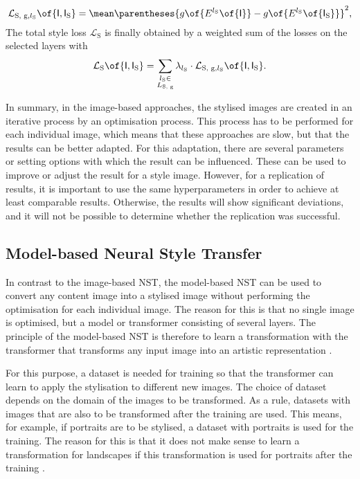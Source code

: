 \begin{equation*}
	\mathcal{L}_{\text{S, g}\eqcommasep l_\text{S}}\of{\tensor{I}\eqcommasep \tensor{I}_\text{S}} = \mean \parentheses{g\of{E^{l_\text{S}}\of{\tensor{I}}} - g\of{E^{l_\text{S}}\of{\tensor{I}_\text{S}}}}^2\eqtextcomma
\end{equation*}
The total style loss $\mathcal{L}_\text{S}$ is finally obtained by a weighted sum of the losses on the selected layers with \cite{GEB2016}
\begin{equation*}
	\mathcal{L}_\text{S}\of{\tensor{I}\eqcommasep \tensor{I}_\text{S}} = \sum_{\substack{l_\text{S} \in\\L_\text{S, g}}} \lambda_{l_\text{S}} \cdot \mathcal{L}_{\text{S, g}\eqcommasep l_\text{S}}\of{\tensor{I}\eqcommasep \tensor{I}_\text{S}} \eqtextdot
\end{equation*}

In summary, in the image-based approaches, the stylised images are created in an iterative process by an optimisation process. This process has to be performed for each individual image, which means that these approaches are slow, but that the results can be better adapted. For this adaptation, there are several parameters or setting options with which the result can be influenced. These can be used to improve or adjust the result for a style image. However, for a replication of results, it is important to use the same hyperparameters in order to achieve at least comparable results. Otherwise, the results will show significant deviations, and it will not be possible to determine whether the replication was successful.

\subsection{Model-based Neural Style Transfer}
In contrast to the image-based \gls{NST}, the model-based \gls{NST} can be used to convert any content image into a stylised image without performing the optimisation for each individual image. The reason for this is that no single image is optimised, but a model or transformer \transformer{} consisting of several layers. The principle of the model-based \gls{NST} is therefore to learn a transformation with the transformer that transforms any input image into an artistic representation \cite{JAL2016}. 

For this purpose, a dataset is needed for training so that the transformer can learn to apply the stylisation to different new images. The choice of dataset depends on the domain of the images to be transformed. As a rule, datasets with images that are also to be transformed after the training are used. This means, for example, if portraits are to be stylised, a dataset with portraits is used for the training. The reason for this is that it does not make sense to learn a transformation for landscapes if this transformation is used for portraits after the training \cite{JAL2016,ULVL2016,UVL2017}.

